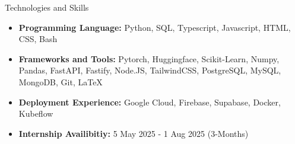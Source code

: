\documentclass[]{mcdowellcv}
\begin{document}
	\begin{cvsection}{Technologies and Skills}
		\begin{cvsubsection}{}{}{}	
			\begin{itemize}
				\item \textbf{Programming Language: } Python, SQL, Typescript, Javascript, HTML, CSS, Bash
				\item \textbf{Frameworks and Tools: } Pytorch, Huggingface, Scikit-Learn, Numpy, Pandas, FastAPI, Fastify, Node.JS, TailwindCSS, PostgreSQL, MySQL, MongoDB, Git, \LaTeX
				\item \textbf{Deployment Experience: } Google Cloud, Firebase, Supabase, Docker, Kubeflow
				\item \textbf{Internship Availibitiy: } 5 May 2025 - 1 Aug 2025 (3-Months)
			\end{itemize}
		\end{cvsubsection}
	\end{cvsection}
	
\end{document}
